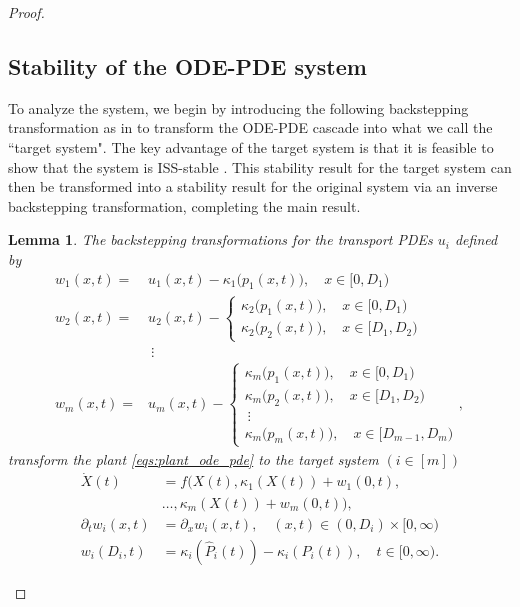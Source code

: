 \documentclass[letterpaper, 10 pt, conference]{ieeeconf}  %
\newtheorem{lemma}[theorem]{Lemma}
\begin{document}
\begin{proof}
\subsection{Stability of the ODE-PDE system}
To analyze the system, we begin by introducing the following backstepping transformation as in \cite{Bekiaris-Liberis_Krstic:2016} to transform the ODE-PDE cascade into what we call the ``target system". The key advantage of the target system is that it is feasible to show that the system is ISS-stable \cite{iasson-iss}. This stability result for the target system can then be transformed into a stability result for the original system via an inverse backstepping transformation, completing the main result. 
\begin{lemma}\label{lemma:backstepping-transform-to-target-system}
The backstepping transformations for the transport PDEs $u_i$ defined by
\begin{subequations}
\begin{align}
    w_1(x,t) =& u_1(x,t) - \kappa_1\bigg(p_1(x,t)\bigg), \quad x \in [0, D_1) \label{eq:w1} \\
    w_2(x,t) =& u_2(x,t) - 
        \begin{cases} 
            \kappa_2\bigg(p_1(x,t)\bigg), \quad x \in [0, D_1) \\
            \kappa_2\bigg(p_2(x,t)\bigg), \quad x \in [D_1, D_2)
        \end{cases} \label{eq:w2} \\
    &\ \vdots \nonumber \\
    w_m(x,t) =& u_m(x,t) - 
        \begin{cases} 
            \kappa_m\bigg(p_1(x,t)\bigg), \quad x \in [0, D_1) \\
            \kappa_m\bigg(p_2(x,t)\bigg), \quad x \in [D_1, D_2) \\
            \ \vdots \\
            \kappa_m\bigg(p_m(x,t)\bigg), \quad x \in [D_{m-1}, D_m)
        \end{cases}, \label{eq:wm}
\end{align}
\end{subequations}
transform the plant \eqref{eqs:plant_ode_pde} to the target system $(i \in [m])$
\begin{subequations}\label{eqs:target}
    \begin{align}
        \dot{X}(t) &= f \bigg( X(t), \kappa_1(X(t)) + w_1(0,t),\nonumber \\ & \dots, \kappa_m(X(t)) + w_m(0,t) \bigg),  \label{eq:target_ode} \\
        \partial_t w_i(x,t) &= \partial_x w_i(x,t), \quad (x,t) \in (0,D_i) \times [0,\infty) \label{eq:target_pde} \\
        w_i(D_i,t) &= \kappa_i(\hat{P}_i(t)) - \kappa_i(P_i(t)), \quad t \in [0,\infty). \label{eq:target_pde_boundary}
    \end{align}
\end{subequations}
\end{lemma}


\end{proof}
\end{document}
